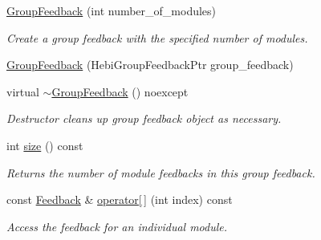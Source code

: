 \begin{DoxyCompactItemize}
\item 
\hyperlink{classhebi_1_1GroupFeedback_af0a41119c345d68c6ae390ff39be77fc}{Group\+Feedback} (int number\+\_\+of\+\_\+modules)\hypertarget{classhebi_1_1GroupFeedback_af0a41119c345d68c6ae390ff39be77fc}{}\label{classhebi_1_1GroupFeedback_af0a41119c345d68c6ae390ff39be77fc}

\begin{DoxyCompactList}\small\item\em Create a group feedback with the specified number of modules. \end{DoxyCompactList}\item 
\hyperlink{classhebi_1_1GroupFeedback_ac12b1f1320eb14943d1b2600b0eecb1b}{Group\+Feedback} (Hebi\+Group\+Feedback\+Ptr group\+\_\+feedback)
\item 
virtual \hyperlink{classhebi_1_1GroupFeedback_aef61ac5e6ac95a4c981cb6fc2d461d5f}{$\sim$\+Group\+Feedback} () noexcept\hypertarget{classhebi_1_1GroupFeedback_aef61ac5e6ac95a4c981cb6fc2d461d5f}{}\label{classhebi_1_1GroupFeedback_aef61ac5e6ac95a4c981cb6fc2d461d5f}

\begin{DoxyCompactList}\small\item\em Destructor cleans up group feedback object as necessary. \end{DoxyCompactList}\item 
int \hyperlink{classhebi_1_1GroupFeedback_adbf31eb50d00db7f286a4888f0d99dc6}{size} () const \hypertarget{classhebi_1_1GroupFeedback_adbf31eb50d00db7f286a4888f0d99dc6}{}\label{classhebi_1_1GroupFeedback_adbf31eb50d00db7f286a4888f0d99dc6}

\begin{DoxyCompactList}\small\item\em Returns the number of module feedbacks in this group feedback. \end{DoxyCompactList}\item 
const \hyperlink{classhebi_1_1Feedback}{Feedback} \& \hyperlink{classhebi_1_1GroupFeedback_a6ebd93cb27aaa00045e34230a935f9eb}{operator\mbox{[}$\,$\mbox{]}} (int index) const \hypertarget{classhebi_1_1GroupFeedback_a6ebd93cb27aaa00045e34230a935f9eb}{}\label{classhebi_1_1GroupFeedback_a6ebd93cb27aaa00045e34230a935f9eb}

\begin{DoxyCompactList}\small\item\em Access the feedback for an individual module. \end{DoxyCompactList}\end{DoxyCompactItemize}
